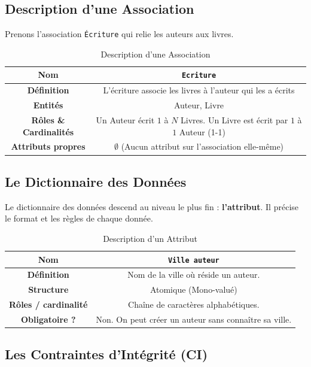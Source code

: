 \subsection{ Description d'une Association}

Prenons l'association \texttt{Écriture} qui relie les auteurs aux livres.

\begin{table}[h]
\centering
\begin{tabular}{|c|c|}
\hline
\textbf{Nom} & \texttt{Ecriture} \\
\hline
\textbf{Définition} & L'écriture associe les livres à l'auteur qui les a écrits \\
\hline
\textbf{Entités} & Auteur, Livre \\
\hline
\textbf{Rôles \& Cardinalités} & Un Auteur écrit $1$ à $N$ Livres. Un Livre est écrit par $1$ à $1$ Auteur (1-1) \\
\hline
\textbf{Attributs propres} & $\emptyset$ (Aucun attribut sur l'association elle-même) \\
\hline
\end{tabular}
\caption{ Description d'une Association }
\end{table}

\subsection{ Le Dictionnaire des Données }

Le dictionnaire des données descend au niveau le plus fin : \textbf{l'attribut}. Il précise le format et les règles de chaque donnée.

\begin{table}[h]
\centering
\begin{tabular}{|c|c|}
\hline
\textbf{Nom} & \texttt{Ville auteur} \\
\hline
\textbf{Définition} & Nom de la ville où réside un auteur. \\
\hline
\textbf{Structure} & Atomique (Mono-valué) \\
\hline
\textbf{Rôles / cardinalité} & Chaîne de caractères alphabétiques. \\
\hline
\textbf{Obligatoire ?} & Non. On peut créer un auteur sans connaître sa ville. \\
\hline
\end{tabular}
\caption{ Description d'un Attribut }
\end{table}

\subsection{ Les Contraintes d'Intégrité (CI) }


